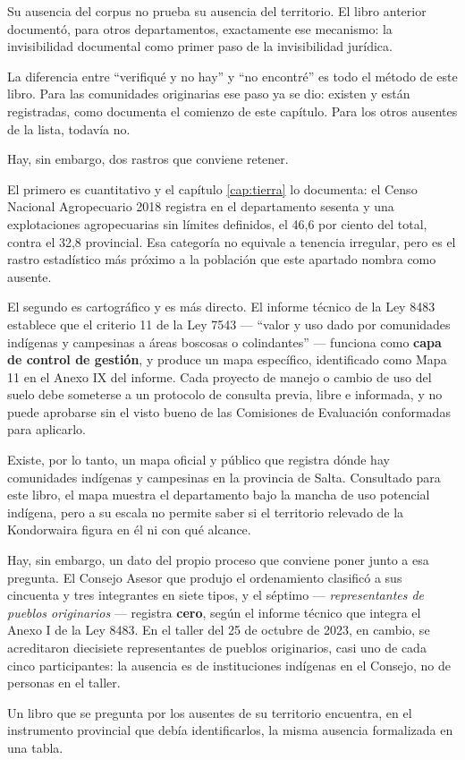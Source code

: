 \begin{cautela}
Su ausencia del corpus no prueba su ausencia del territorio. El libro anterior documentó, para otros departamentos, exactamente ese mecanismo: la invisibilidad documental como primer paso de la invisibilidad jurídica.

La diferencia entre ``verifiqué y no hay'' y ``no encontré'' es todo el método de este libro. Para las comunidades originarias ese paso ya se dio: existen y están registradas, como documenta el comienzo de este capítulo. Para los otros ausentes de la lista, todavía no.

Hay, sin embargo, dos rastros que conviene retener.

El primero es cuantitativo y el capítulo \ref{cap:tierra} lo documenta: el Censo Nacional Agropecuario 2018 registra en el departamento sesenta y una explotaciones agropecuarias sin límites definidos, el 46,6 por ciento del total, contra el 32,8 provincial. Esa categoría no equivale a tenencia irregular, pero es el rastro estadístico más próximo a la población que este apartado nombra como ausente.

El segundo es cartográfico y es más directo. El informe técnico de la Ley 8483 establece que el criterio 11 de la Ley 7543 --- ``valor y uso dado por comunidades indígenas y campesinas a áreas boscosas o colindantes'' --- funciona como \textbf{capa de control de gestión}, y produce un mapa específico, identificado como Mapa 11 en el Anexo IX del informe. Cada proyecto de manejo o cambio de uso del suelo debe someterse a un protocolo de consulta previa, libre e informada, y no puede aprobarse sin el visto bueno de las Comisiones de Evaluación conformadas para aplicarlo.

Existe, por lo tanto, un mapa oficial y público que registra dónde hay comunidades indígenas y campesinas en la provincia de Salta. Consultado para este libro, el mapa muestra el departamento bajo la mancha de uso potencial indígena, pero a su escala no permite saber si el territorio relevado de la Kondorwaira figura en él ni con qué alcance.

Hay, sin embargo, un dato del propio proceso que conviene poner junto a esa pregunta. El Consejo Asesor que produjo el ordenamiento clasificó a sus cincuenta y tres integrantes en siete tipos, y el séptimo --- \textit{representantes de pueblos originarios} --- registra \textbf{cero}, según el informe técnico que integra el Anexo I de la Ley 8483. En el taller del 25 de octubre de 2023, en cambio, se acreditaron diecisiete representantes de pueblos originarios, casi uno de cada cinco participantes: la ausencia es de instituciones indígenas en el Consejo, no de personas en el taller.

Un libro que se pregunta por los ausentes de su territorio encuentra, en el instrumento provincial que debía identificarlos, la misma ausencia formalizada en una tabla.
\end{cautela}

